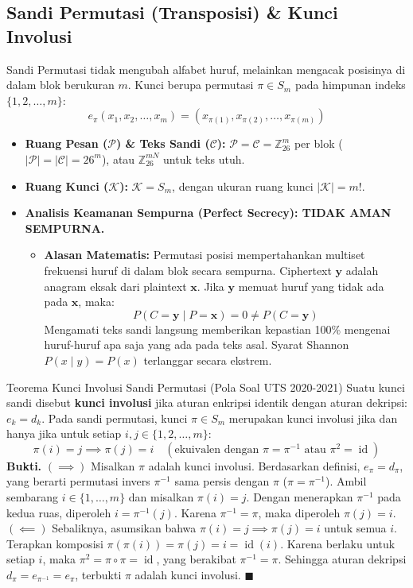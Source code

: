 \documentclass[11pt,a4paper]{article}
\newenvironment{proof}{\noindent\textbf{Bukti.}}{\hfill$\blacksquare$\vspace{0.3em}}
\begin{document}
\subsection{Sandi Permutasi (Transposisi) \& Kunci Involusi}
Sandi Permutasi tidak mengubah alfabet huruf, melainkan mengacak posisinya di dalam blok berukuran $m$. Kunci berupa permutasi $\pi \in S_m$ pada himpunan indeks $\{1, 2, \dots, m\}$:
\[
e_\pi(x_1, x_2, \dots, x_m) = (x_{\pi(1)}, x_{\pi(2)}, \dots, x_{\pi(m)})
\]
\begin{itemize}[leftmargin=*]
    \item \textbf{Ruang Pesan ($\mathcal{P}$) \& Teks Sandi ($\mathcal{C}$):} $\mathcal{P} = \mathcal{C} = \mathbb{Z}_{26}^m$ per blok ($|\mathcal{P}| = |\mathcal{C}| = 26^m$), atau $\mathbb{Z}_{26}^{mN}$ untuk teks utuh.
    \item \textbf{Ruang Kunci ($\mathcal{K}$):} $\mathcal{K} = S_m$, dengan ukuran ruang kunci $|\mathcal{K}| = m!$.
    \item \textbf{Analisis Keamanan Sempurna (Perfect Secrecy): TIDAK AMAN SEMPURNA.}
    \begin{itemize}
        \item \textbf{Alasan Matematis:} Permutasi posisi mempertahankan multiset frekuensi huruf di dalam blok secara sempurna. Ciphertext $\mathbf{y}$ adalah anagram eksak dari plaintext $\mathbf{x}$. Jika $\mathbf{y}$ memuat huruf yang tidak ada pada $\mathbf{x}$, maka:
        \[
        P(C = \mathbf{y} \mid P = \mathbf{x}) = 0 \neq P(C = \mathbf{y})
        \]
        Mengamati teks sandi langsung memberikan kepastian 100\% mengenai huruf-huruf apa saja yang ada pada teks asal. Syarat Shannon $P(x \mid y) = P(x)$ terlanggar secara ekstrem.
    \end{itemize}
\end{itemize}

\begin{thmbox}{Teorema Kunci Involusi Sandi Permutasi (Pola Soal UTS 2020-2021)}
Suatu kunci sandi disebut \textbf{kunci involusi} jika aturan enkripsi identik dengan aturan dekripsi: $e_k = d_k$. Pada sandi permutasi, kunci $\pi \in S_m$ merupakan kunci involusi jika dan hanya jika untuk setiap $i, j \in \{1, 2, \dots, m\}$:
\[
\pi(i) = j \implies \pi(j) = i \quad (\text{ekuivalen dengan } \pi = \pi^{-1} \text{ atau } \pi^2 = \operatorname{id})
\]
\begin{proof}
$(\implies)$ Misalkan $\pi$ adalah kunci involusi. Berdasarkan definisi, $e_\pi = d_\pi$, yang berarti permutasi invers $\pi^{-1}$ sama persis dengan $\pi$ ($\pi = \pi^{-1}$). Ambil sembarang $i \in \{1, \dots, m\}$ dan misalkan $\pi(i) = j$. Dengan menerapkan $\pi^{-1}$ pada kedua ruas, diperoleh $i = \pi^{-1}(j)$. Karena $\pi^{-1} = \pi$, maka diperoleh $\pi(j) = i$.\\
$(\impliedby)$ Sebaliknya, asumsikan bahwa $\pi(i) = j \implies \pi(j) = i$ untuk semua $i$. Terapkan komposisi $\pi(\pi(i)) = \pi(j) = i = \operatorname{id}(i)$. Karena berlaku untuk setiap $i$, maka $\pi^2 = \pi \circ \pi = \operatorname{id}$, yang berakibat $\pi^{-1} = \pi$. Sehingga aturan dekripsi $d_\pi = e_{\pi^{-1}} = e_\pi$, terbukti $\pi$ adalah kunci involusi.
\end{proof}
\end{thmbox}
\end{document}
